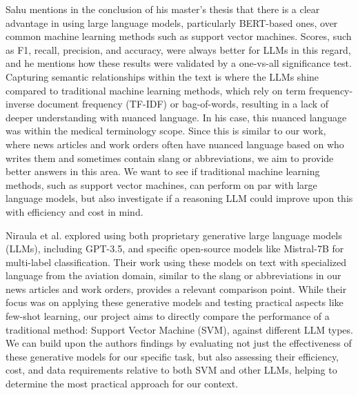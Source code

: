 Sahu \cite{sahu2025language} mentions in the conclusion of his master's thesis that there is a clear advantage in using large language models, particularly BERT-based ones, over common machine learning methods such as support vector machines. Scores, such as F1, recall, precision, and accuracy, were always better for LLMs in this regard, and he mentions how these results were validated by a one-vs-all significance test. Capturing semantic relationships within the text is where the LLMs shine compared to traditional machine learning methods, which rely on term frequency-inverse document frequency (TF-IDF) or bag-of-words, resulting in a lack of deeper understanding with nuanced language. In his case, this nuanced language was within the medical terminology scope. Since this is similar to our work, where news articles and work orders often have nuanced language based on who writes them and sometimes contain slang or abbreviations, we aim to provide better answers in this area. We want to see if traditional machine learning methods, such as support vector machines, can perform on par with large language models, but also investigate if a reasoning LLM could improve upon this with efficiency and cost in mind.

Niraula et al. \cite{niraula2024multi} explored using both proprietary generative large language models (LLMs), including GPT-3.5, and specific open-source models like Mistral-7B for multi-label classification. Their work using these models on text with specialized language from the aviation domain, similar to the slang or abbreviations in our news articles and work orders, provides a relevant comparison point. While their focus was on applying these generative models and testing practical aspects like few-shot learning, our project aims to directly compare the performance of a traditional method: Support Vector Machine (SVM), against different LLM types. We can build upon the authors findings by evaluating not just the effectiveness of these generative models for our specific task, but also assessing their efficiency, cost, and data requirements relative to both SVM and other LLMs, helping to determine the most practical approach for our context.

